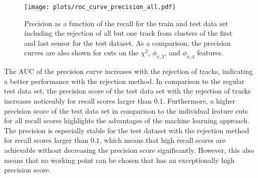 
\begin{figure}[H]
  \centering
  \texttt{[image: plots/roc\_curve\_precision\_all.pdf]}
  \caption{Precision as a function of the recall for the train and test data set including the rejection of all but one track from clusters of the first and last
           sensor for the test dataset. As a comparison, the precision curves are also shown for cuts on the $\chi^2$, $\phi_{x,3}$, and $\phi_{x,4}$ features.}
  \label{fig:precision}
\end{figure}
The AUC of the precision curve increases with the rejection of tracks,
indicating a better performance with the rejection method. In comparison to the regular test data set, the precision score
of the test data set with the rejection of tracks increases noticeably for recall scores larger than 0.1.
Furthermore, a higher precision score of the test data set in comparison to the individual feature cuts for all recall scores highlights the advantages of the machine
learning approach. The precision is especially stable for the test dataset with the rejection method for recall scores larger than $0.1$, which means that high recall scores
are achievable without decreasing the precision score significantly. However, this also means that no working point can be chosen that has an exceptionally high precision score.
